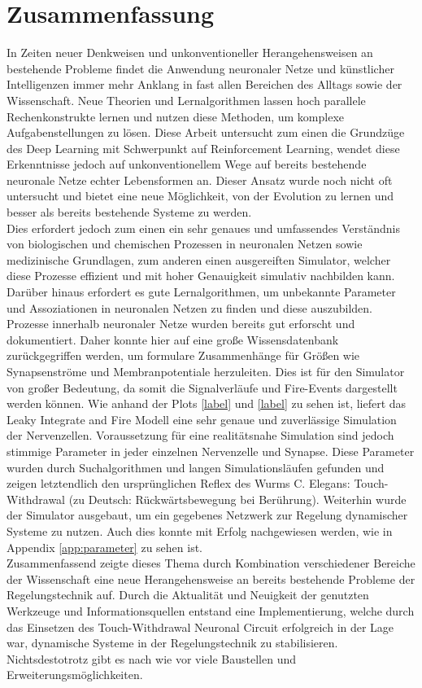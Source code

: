 \section{Zusammenfassung}
\label{sec:erg_zsm}
	In Zeiten neuer Denkweisen und unkonventioneller Herangehensweisen an bestehende Probleme findet die Anwendung neuronaler Netze und künstlicher Intelligenzen immer mehr Anklang in fast allen Bereichen des Alltags sowie der Wissenschaft. Neue Theorien und Lernalgorithmen lassen hoch parallele Rechenkonstrukte lernen und nutzen diese Methoden, um komplexe Aufgabenstellungen zu lösen. Diese Arbeit untersucht zum einen die Grundzüge des Deep Learning mit Schwerpunkt auf Reinforcement Learning, wendet diese Erkenntnisse jedoch auf unkonventionellem Wege auf bereits bestehende neuronale Netze echter Lebensformen an. Dieser Ansatz wurde noch nicht oft untersucht und bietet eine neue Möglichkeit, von der Evolution zu lernen und besser als bereits bestehende Systeme zu werden.\\
	Dies erfordert jedoch zum einen ein sehr genaues und umfassendes Verständnis von biologischen und chemischen Prozessen in neuronalen Netzen sowie medizinische Grundlagen, zum anderen einen ausgereiften Simulator, welcher diese Prozesse effizient und mit hoher Genauigkeit simulativ nachbilden kann. Darüber hinaus erfordert es gute Lernalgorithmen, um unbekannte Parameter und Assoziationen in neuronalen Netzen zu finden und diese auszubilden.\\
	Prozesse innerhalb neuronaler Netze wurden bereits gut erforscht und dokumentiert. Daher konnte hier auf eine große Wissensdatenbank zurückgegriffen werden, um formulare Zusammenhänge für Größen wie Synapsenströme und Membranpotentiale herzuleiten. Dies ist für den Simulator von großer Bedeutung, da somit die Signalverläufe und Fire-Events dargestellt werden können. Wie anhand der Plots \ref{label} und \ref{label} zu sehen ist, liefert das Leaky Integrate and Fire Modell eine sehr genaue und zuverlässige Simulation der Nervenzellen. Voraussetzung für eine realitätsnahe Simulation sind jedoch stimmige Parameter in jeder einzelnen Nervenzelle und Synapse. Diese Parameter wurden durch Suchalgorithmen und langen Simulationsläufen gefunden und zeigen letztendlich den ursprünglichen Reflex des Wurms C. Elegans: Touch-Withdrawal (zu Deutsch: Rückwärtsbewegung bei Berührung). Weiterhin wurde der Simulator ausgebaut, um ein gegebenes Netzwerk zur Regelung dynamischer Systeme zu nutzen. Auch dies konnte mit Erfolg nachgewiesen werden, wie in Appendix \ref{app:parameter} zu sehen ist.\\
	Zusammenfassend zeigte dieses Thema durch Kombination verschiedener Bereiche der Wissenschaft eine neue Herangehensweise an bereits bestehende Probleme der Regelungstechnik auf. Durch die Aktualität und Neuigkeit der genutzten Werkzeuge und Informationsquellen entstand eine Implementierung, welche durch das Einsetzen des Touch-Withdrawal Neuronal Circuit \cite{WormLevelRL} erfolgreich in der Lage war, dynamische Systeme in der Regelungstechnik zu stabilisieren.\\
	Nichtsdestotrotz gibt es nach wie vor viele Baustellen und Erweiterungsmöglichkeiten.

